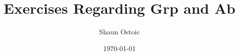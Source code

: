 \documentclass[12pt]{article}
\title{Exercises Regarding \textbf{Grp} and \textbf{Ab}}
\author{Shaun Ostoic}
\date{\today}
\begin{document}
\baselineskip 18pt

\theoremstyle{definition}
\newtheorem{definition}{D{\scriptsize EFINITION}}[section]
\newtheorem{example}{E{\scriptsize XAMPLE}}[section]
\newtheorem{remark}{R{\scriptsize EMARK}}[section]

\theoremstyle{plain}
\newtheorem{theorem}{T{\scriptsize HEOREM}}[section]
\newtheorem{proposition}[theorem] {P{\scriptsize ROPOSITION}}
\newtheorem{corollary}[theorem]{C{\scriptsize OROLLARY}}
\newtheorem{lemma}[theorem]{L{\scriptsize EMMA}}


\newenvironment{solution}
  {\begin{proof}[Solution]}
  {\end{proof}}

\maketitle
\end{document}
